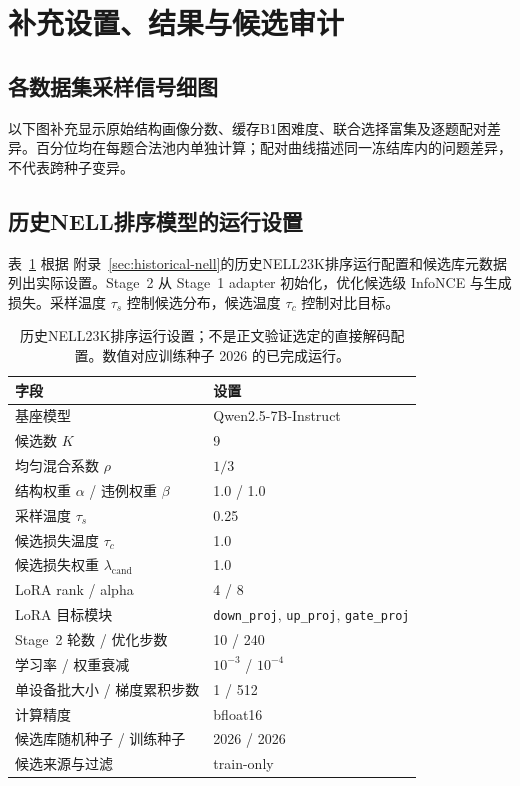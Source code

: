 \section{补充设置、结果与候选审计}

\subsection{各数据集采样信号细图}
\label{sec:sampling-diagnostics-appendix}

以下图补充显示原始结构画像分数、缓存B1困难度、联合选择富集及逐题配对差异。百分位均在每题合法池内单独计算；配对曲线描述同一冻结库内的问题差异，不代表跨种子变异。




\subsection{历史NELL排序模型的运行设置}

表~\ref{tab:hyper} 根据 附录~\ref{sec:historical-nell}的历史NELL23K排序运行配置和候选库元数据列出实际设置。Stage~2 从 Stage~1 adapter 初始化，优化候选级 InfoNCE 与生成损失。采样温度 $\tau_s$ 控制候选分布，候选温度 $\tau_c$ 控制对比目标。

\begin{table}[htbp]
\caption{历史NELL23K排序运行设置；不是正文验证选定的直接解码配置。数值对应训练种子 2026 的已完成运行。}
\label{tab:hyper}
\centering\small
\begin{tabular}{ll}
\toprule
字段 & 设置 \\
\midrule
基座模型 & Qwen2.5-7B-Instruct \\
候选数 $K$ & 9 \\
均匀混合系数 $\rho$ & $1/3$ \\
结构权重 $\alpha$ / 违例权重 $\beta$ & 1.0 / 1.0 \\
采样温度 $\tau_s$ & 0.25 \\
候选损失温度 $\tau_c$ & 1.0 \\
候选损失权重 $\lambda_{\mathrm{cand}}$ & 1.0 \\
LoRA rank / alpha & 4 / 8 \\
LoRA 目标模块 & \texttt{down\_proj}, \texttt{up\_proj}, \texttt{gate\_proj} \\
Stage~2 轮数 / 优化步数 & 10 / 240 \\
学习率 / 权重衰减 & $10^{-3}$ / $10^{-4}$ \\
单设备批大小 / 梯度累积步数 & 1 / 512 \\
计算精度 & bfloat16 \\
候选库随机种子 / 训练种子 & 2026 / 2026 \\
候选来源与过滤 & train-only \\
\bottomrule
\end{tabular}
\end{table}

